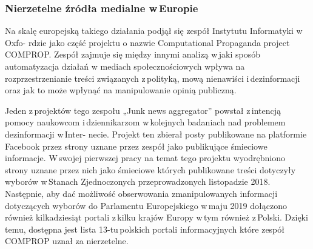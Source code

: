\subsubsection{Nierzetelne źródła medialne w\,Europie} \label{nierzetelne-zrodla-eu}
Na skalę europejską takiego działania podjął się zespół Instytutu Informatyki w\,Oxfo- rdzie jako część projektu o nazwie Computational Propaganda project COMPROP. Zespół zajmuje się między innymi analizą w\,jaki sposób automatyzacja działań w mediach społecznościowych wpływa na rozprzestrzenianie treści związanych z\,polityką, mową nienawiści i\,dezinformacji oraz jak to może wpłynąć na manipulowanie opinią publiczną. 
\par
Jeden z\,projektów tego zespołu „Junk news aggregator” powstał z\,intencją pomocy naukowcom i\,dziennikarzom w\,kolejnych badaniach nad problemem dezinformacji w\,Inter- necie. Projekt ten zbierał posty publikowane na platformie Facebook przez strony uznane przez zespół jako publikujące śmieciowe informacje.  W\,swojej pierwszej pracy na temat tego projektu\cite{liotsiou2019junk} wyodrębniono strony uznane przez nich jako śmieciowe których publikowane treści dotyczyły wyborów w\,Stanach Zjednoczonych przeprowadzonych listopadzie 2018. Następnie, aby dać możliwość obserwowania zmanipulowanych informacji dotyczących wyborów do Parlamentu Europejskiego w\,maju 2019 dołączono również kilkadziesiąt portali z\,kilku krajów Europy w\,tym również z\,Polski. Dzięki temu, dostępna jest lista 13-tu\,polskich portali informacyjnych które zespół COMPROP uznał za nierzetelne. 
